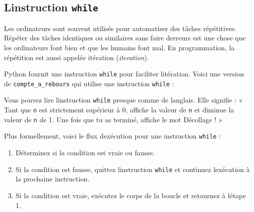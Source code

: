 \hypertarget{linstruction-while}{%
\subsection{\texorpdfstring{L\textquotesingle instruction
\texttt{while}}{L\textquotesingle instruction while}}\label{linstruction-while}}

Les ordinateurs sont souvent utilisés pour automatiser des tâches
répétitives. Répéter des tâches identiques ou similaires sans faire
d\textquotesingle erreurs est une chose que les ordinateurs font bien et
que les humains font mal. En programmation, la répétition est aussi
appelée itération (\emph{iteration}).

Python fournit une instruction \texttt{while} pour faciliter
l\textquotesingle itération. Voici une version de
\texttt{compte\_a\_rebours} qui utilise une instruction \texttt{while} :

\begin{Shaded}
\begin{Highlighting}[]
    \OperatorTok{\textgreater{}} \NormalTok{:}
\OperatorTok{=}\OperatorTok{{-}} 
    \NormalTok{(}\NormalTok{)}
\end{Highlighting}
\end{Shaded}

Vous pouvez lire l\textquotesingle instruction \texttt{while} presque
comme de l\textquotesingle anglais. Elle signifie : « Tant que
\texttt{n} est strictement supérieur à 0, affiche la valeur de
\texttt{n} et diminue la valeur de \texttt{n} de 1. Une fois que tu as
terminé, affiche le mot Décollage ! »

Plus formellement, voici le flux d\textquotesingle exécution pour une
instruction \texttt{while} :

\begin{enumerate}
\def\labelenumi{\arabic{enumi}.}
\tightlist
\item
  Déterminez si la condition est vraie ou fausse.
\item
  Si la condition est fausse, quittez l\textquotesingle instruction
  \texttt{while} et continuez l\textquotesingle exécution à la prochaine
  instruction.
\item
  Si la condition est vraie, exécutez le corps de la boucle et retournez
  à l\textquotesingle étape 1.
\end{enumerate}

